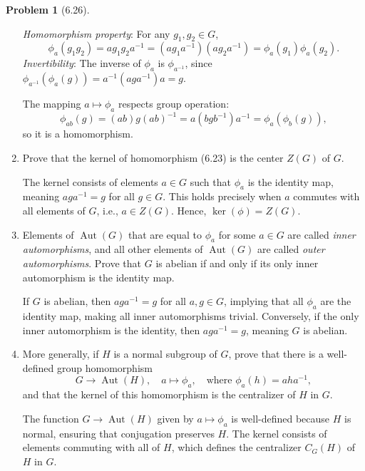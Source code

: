 \documentclass[12pt]{article}
\theoremstyle{definition}
\newtheorem{problem}{Problem}
\DeclareMathOperator{\Aut}{Aut}
\begin{document}
\begin{problem}[6.26]
\begin{enumerate}[label=(\alph*)]
\begin{solution}
            \textit{Homomorphism property}: For any $g_1, g_2 \in G$,
            \[
                \phi_a(g_1 g_2) = a g_1 g_2 a^{-1} = (a g_1 a^{-1})(a g_2 a^{-1}) = \phi_a(g_1)\phi_a(g_2).
            \]
            \textit{Invertibility}: The inverse of $\phi_a$ is $\phi_{a^{-1}}$, since $\phi_{a^{-1}}(\phi_a(g)) = a^{-1} (aga^{-1}) a = g$.
            
            The mapping $a \mapsto \phi_a$ respects group operation:
            \[
                \phi_{ab}(g) = (ab) g (ab)^{-1} = a(b g b^{-1}) a^{-1} = \phi_a(\phi_b(g)),
            \]
            so it is a homomorphism.
        \end{solution}

        \item Prove that the kernel of homomorphism (6.23) is the center $Z(G)$ of $G$.
        
        \begin{solution}
            The kernel consists of elements $a \in G$ such that $\phi_a$ is the identity map, meaning $aga^{-1} = g$ for all $g \in G$. This holds precisely when $a$ commutes with all elements of $G$, i.e., $a \in Z(G)$. Hence, $\ker(\phi) = Z(G)$.
        \end{solution}

        \item Elements of $\Aut(G)$ that are equal to $\phi_a$ for some $a \in G$ are called \textit{inner automorphisms},
              and all other elements of $\Aut(G)$ are called \textit{outer automorphisms}. Prove that $G$ is abelian if
              and only if its only inner automorphism is the identity map.

        \begin{solution}
            If $G$ is abelian, then $aga^{-1} = g$ for all $a, g \in G$, implying that all $\phi_a$ are the identity map, making all inner automorphisms trivial. Conversely, if the only inner automorphism is the identity, then $aga^{-1} = g$, meaning $G$ is abelian.
        \end{solution}

        \item More generally, if $H$ is a normal subgroup of $G$, prove that there is a well-defined group homomorphism
              \[
                  G \longrightarrow \Aut(H), \quad a \mapsto \phi_a, \quad \text{where } \phi_a(h) = aha^{-1}, 
              \]
              and that the kernel of this homomorphism is the centralizer of $H$ in $G$.

              \begin{solution}
                The function $G \to \Aut(H)$ given by $a \mapsto \phi_a$ is well-defined because $H$ is normal, ensuring that conjugation preserves $H$. The kernel consists of elements commuting with all of $H$, which defines the centralizer $C_G(H)$ of $H$ in $G$.
              \end{solution}
    \end{enumerate}
\end{problem}
\end{document}
